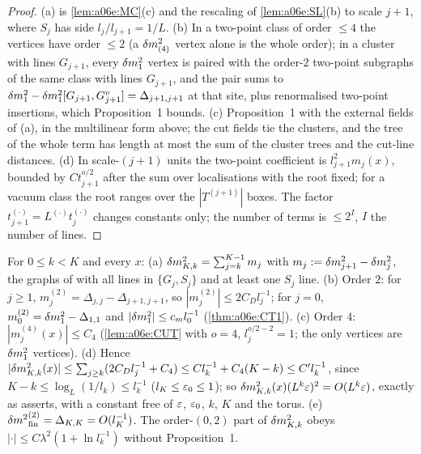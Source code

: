 \begin{proof}
(a) is \cref{lem:a06e:MC}(c) and the rescaling of \cref{lem:a06e:SL}(b) to scale $j+1$, where $S_j$ has side $l_j/l_{j+1}=1/L$. (b) In a two-point class of order $\le4$ the \cite[(1.7)]{Ba3} vertices have order $\le2$ (a $\delta m^2_{(4)}$ vertex alone is the whole order); in a cluster with lines $G_{j+1}$, every $\delta m^2_1$ vertex is paired with the order-$2$ two-point subgraphs of the same class with lines $G_{j+1}$, and the pair sums to $\delta m^2_1-\delta m^2_1[G_{j+1},G^v_{j+1}]=\Delta_{j+1,j+1}$ at that site, plus renormalised two-point insertions, which Proposition~1 bounds. (c) Proposition~1 with the external fields of (a), in the multilinear form above; the cut fields tie the clusters, and the tree of the whole term has length at most the sum of the cluster trees and the cut-line distances. (d) In scale-$(j+1)$ units the two-point coefficient is $l_{j+1}^2m_j(x)$, bounded by $Ct_{j+1}^{o/2}$ after the sum over localisations with the root fixed; for a vacuum class the root ranges over the $|T^{(j+1)}|$ boxes. The factor $t_{j+1}^{(\cdot)}=L^{(\cdot)}t_j^{(\cdot)}$ changes constants only; the number of terms is $\le2^{I}$, $I$ the number of lines.
\end{proof}

\begin{theorem}[{$\dm_{K,k}=O((L^k\eps)^{-1})$, \cite[(1.28)]{Ba3}}]\label{thm:a06e:DM}
For $0\le k<K$ and every $x$: \textup{(a)} $\delta m^2_{K,k}=\sum_{j=k}^{K-1}m_j$ with $m_j:=\delta m^2_{j+1}-\delta m^2_j$, the graphs of \cite[(1.23)]{Ba3} with all lines in $\{G_j,S_j\}$ and at least one $S_j$ line. \textup{(b)} Order $2$: for $j\ge1$, $m^{(2)}_j=\Delta_{j,j}-\Delta_{j+1,j+1}$, so $|m^{(2)}_j|\le2C_Dl_j^{-1}$; for $j=0$, $m^{(2)}_0=\delta m^2_1-\Delta_{1,1}$ and $|\delta m^2_1|\le c_ml_0^{-1}$ (\cref{thm:a06e:CT1}). \textup{(c)} Order $4$: $|m^{(4)}_j(x)|\le C_4$ (\cref{lem:a06e:CUT} with $o=4$, $l_j^{o/2-2}=1$; the only \cite[(1.7)]{Ba3} vertices are $\delta m^2_1$ vertices). \textup{(d)} Hence $|\delta m^2_{K,k}(x)|\le\sum_{j\ge k}(2C_Dl_j^{-1}+C_4)\le Cl_k^{-1}+C_4(K-k)\le C'l_k^{-1}$, since $K-k\le\log_L(1/l_k)\le l_k^{-1}$ ($l_K\le\varepsilon_0\le1$); so $\delta m^2_{K,k}(x)(L^k\varepsilon)^2=O(L^k\varepsilon)$, exactly as \cite[p.~418]{Ba3} asserts, with a constant free of $\varepsilon$, $\varepsilon_0$, $k$, $K$ and the torus. \textup{(e)} ${\delta m^2}^{(2)}_{\mathrm{fin}}=\Delta_{K,K}=O(l_K^{-1})$. The order-$(0,2)$ part of $\delta m^2_{K,k}$ obeys $|\cdot|\le C\lambda^2(1+\ln l_k^{-1})$ without Proposition~1.
\end{theorem}

